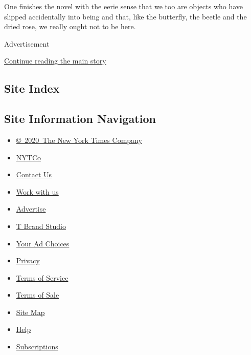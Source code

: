One finishes the novel with the eerie sense that we too are objects who
have slipped accidentally into being and that, like the butterfly, the
beetle and the dried rose, we really ought not to be here.

Advertisement

\protect\hyperlink{after-bottom}{Continue reading the main story}

\hypertarget{site-index}{%
\subsection{Site Index}\label{site-index}}

\hypertarget{site-information-navigation}{%
\subsection{Site Information
Navigation}\label{site-information-navigation}}

\begin{itemize}
\tightlist
\item
  \href{https://help.nytimes3xbfgragh.onion/hc/en-us/articles/115014792127-Copyright-notice}{©~2020~The
  New York Times Company}
\end{itemize}

\begin{itemize}
\tightlist
\item
  \href{https://www.nytco.com/}{NYTCo}
\item
  \href{https://help.nytimes3xbfgragh.onion/hc/en-us/articles/115015385887-Contact-Us}{Contact
  Us}
\item
  \href{https://www.nytco.com/careers/}{Work with us}
\item
  \href{https://nytmediakit.com/}{Advertise}
\item
  \href{http://www.tbrandstudio.com/}{T Brand Studio}
\item
  \href{https://www.nytimes3xbfgragh.onion/privacy/cookie-policy\#how-do-i-manage-trackers}{Your
  Ad Choices}
\item
  \href{https://www.nytimes3xbfgragh.onion/privacy}{Privacy}
\item
  \href{https://help.nytimes3xbfgragh.onion/hc/en-us/articles/115014893428-Terms-of-service}{Terms
  of Service}
\item
  \href{https://help.nytimes3xbfgragh.onion/hc/en-us/articles/115014893968-Terms-of-sale}{Terms
  of Sale}
\item
  \href{https://spiderbites.nytimes3xbfgragh.onion}{Site Map}
\item
  \href{https://help.nytimes3xbfgragh.onion/hc/en-us}{Help}
\item
  \href{https://www.nytimes3xbfgragh.onion/subscription?campaignId=37WXW}{Subscriptions}
\end{itemize}
